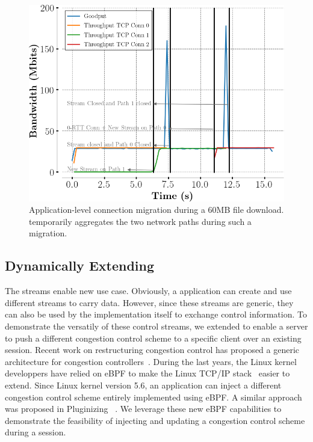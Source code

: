 \begin{figure}[!t]
  \begin{center}
    \includegraphics[width=.8\columnwidth]{figures/migration.png}
  \end{center}
\vspace{-0.5cm}
  \caption{Application-level connection migration during a 60MB file download.
    \tcpls temporarily aggregates the two network paths during such a migration.}
  \label{fig:conn_migration}
\end{figure}

\subsection{Dynamically Extending \tcpls}

The \tcpls streams enable new use case. Obviously, a \tcpls application can
create and use different streams to carry data. However, since these streams
are generic, they can also be used by the \tcpls implementation itself to
exchange control information. To demonstrate the versatily of these control
streams, we extended \tcpls to enable a server to push a different congestion
control scheme to a specific client over an existing \tcpls session. Recent
work on restructuring congestion control has proposed a generic architecture
for congestion controllers~\cite{narayan2018restructuring}.
During the last years, the Linux kernel developpers have relied on eBPF
to make the Linux TCP/IP stack~\cite{brakmo2017tcp,tran2020beyond} easier
to extend. Since Linux kernel version 5.6, an application can inject
a different congestion control scheme entirely implemented using eBPF. A similar
approach was proposed in Pluginizing \quic~\cite{de2019pluginizing}. We
leverage these new eBPF capabilities to demonstrate the feasibility of injecting
and updating a congestion control scheme during a \tcpls session.

